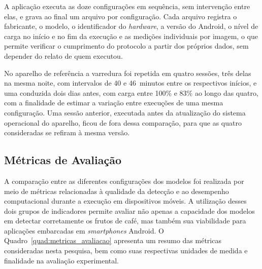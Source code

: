 \documentclass[artigo,times,capa]{iftex2024}
\begin{document}
A aplicação executa as doze configurações em sequência, sem intervenção entre
elas, e grava ao final um arquivo por configuração. Cada arquivo registra o
fabricante, o modelo, o identificador do \textit{hardware}, a versão do
Android, o nível de carga no início e no fim da execução e as medições
individuais por imagem, o que permite verificar o cumprimento do protocolo a
partir dos próprios dados, sem depender do relato de quem executou.

No aparelho de referência a varredura foi repetida em quatro
sessões, três delas na mesma noite, com intervalos de 40 e 46~minutos entre os
respectivos inícios, e uma conduzida dois dias antes, com carga entre 100\% e
83\% ao longo das quatro, com a finalidade de estimar a variação entre
execuções de uma mesma configuração. Uma sessão anterior, executada antes da
atualização do sistema operacional do aparelho, ficou de fora dessa
comparação, para que as quatro consideradas se refiram à mesma versão.

\subsection{Métricas de Avaliação}

A comparação entre as diferentes configurações dos modelos foi realizada por meio de métricas relacionadas à qualidade da detecção e ao desempenho computacional durante a execução em dispositivos móveis. A utilização desses dois grupos de indicadores permite avaliar não apenas a capacidade dos modelos em detectar corretamente os frutos de café, mas também sua viabilidade para aplicações embarcadas em \textit{smartphones} Android. O Quadro~\ref{quad:metricas_avaliacao} apresenta um resumo das métricas consideradas nesta pesquisa, bem como suas respectivas unidades de medida e finalidade na avaliação experimental.
\end{document}

